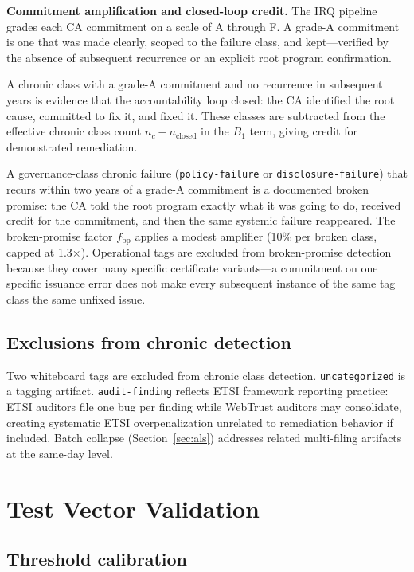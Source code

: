 \documentclass[10pt,twocolumn,letterpaper]{article}
\begin{document}
\textbf{Commitment amplification and closed-loop credit.} The IRQ pipeline grades each
CA commitment on a scale of A through F. A grade-A commitment is one that was made
clearly, scoped to the failure class, and kept---verified by the absence of subsequent
recurrence or an explicit root program confirmation.

A chronic class with a grade-A commitment and no recurrence in subsequent years is
evidence that the accountability loop closed: the CA identified the root cause, committed
to fix it, and fixed it. These classes are subtracted from the effective chronic class
count $n_c - n_{\text{closed}}$ in the $B_1$ term, giving credit for demonstrated
remediation.

A governance-class chronic failure (\texttt{policy-failure} or
\texttt{disclosure-failure}) that recurs within two years of a grade-A commitment is
a documented broken promise: the CA told the root program exactly what it was going
to do, received credit for the commitment, and then the same systemic failure
reappeared. The broken-promise factor $f_{\text{bp}}$ applies a modest amplifier
(10\% per broken class, capped at 1.3$\times$). Operational tags are excluded from
broken-promise detection because they cover many specific certificate variants---a
commitment on one specific issuance error does not make every subsequent instance of
the same tag class the same unfixed issue.

\subsection{Exclusions from chronic detection}
\label{sec:exclusions}

Two whiteboard tags are excluded from chronic class detection.
\texttt{uncategorized} is a tagging artifact. \texttt{audit-finding} reflects
ETSI framework reporting practice: ETSI auditors file one bug per finding while
WebTrust auditors may consolidate, creating systematic ETSI overpenalization
unrelated to remediation behavior if included. Batch collapse (Section~\ref{sec:als})
addresses related multi-filing artifacts at the same-day level.

\section{Test Vector Validation}
\label{sec:testvectors}

\subsection{Threshold calibration}
\end{document}
